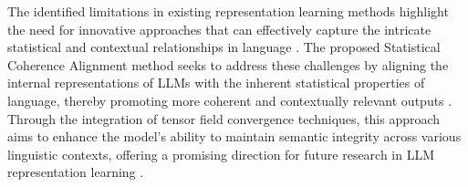 The identified limitations in existing representation learning methods highlight the need for innovative approaches that can effectively capture the intricate statistical and contextual relationships in language \cite{lodin2024dynamic}. The proposed Statistical Coherence Alignment method seeks to address these challenges by aligning the internal representations of LLMs with the inherent statistical properties of language, thereby promoting more coherent and contextually relevant outputs \cite{grushail2024adaptive}. Through the integration of tensor field convergence techniques, this approach aims to enhance the model's ability to maintain semantic integrity across various linguistic contexts, offering a promising direction for future research in LLM representation learning \cite{verscaj2024innovative}.